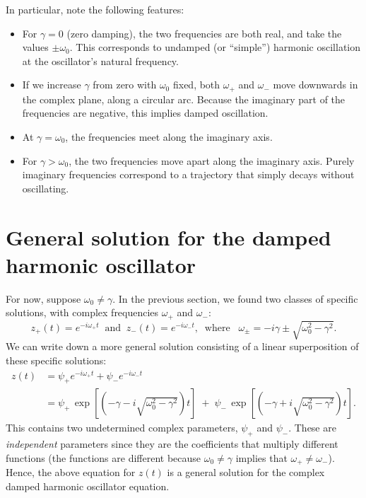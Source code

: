 \documentclass[10pt,a4paper]{article}
\begin{document}
\pagebreak
\noindent
In particular, note the following features:
\begin{itemize}
\item
  For $\gamma = 0$ (zero damping), the two frequencies are both real,
  and take the values $\pm \omega_0$. This corresponds to undamped (or
  ``simple'') harmonic oscillation at the oscillator's natural
  frequency.
\item
  If we increase $\gamma$ from zero with $\omega_0$ fixed, both
  $\omega_+$ and $\omega_-$ move downwards in the complex plane,
  along a circular arc. Because the imaginary part of the frequencies
  are negative, this implies damped oscillation.

\item
  At $\gamma = \omega_0$, the frequencies meet along the imaginary
  axis.

\item
  For $\gamma > \omega_0$, the two frequencies move apart along the
  imaginary axis. Purely imaginary frequencies correspond to a
  trajectory that simply decays without oscillating.
\end{itemize}

\section{General solution for the damped harmonic oscillator}
\label{general-solution}

For now, suppose $\omega_0 \ne \gamma$. In the previous section, we
found two classes of specific solutions, with complex frequencies
$\omega_+$ and $\omega_-$:
\begin{equation}
  z_+(t) = e^{-i\omega_+ t} \;\;\mathrm{and}\;\;
  z_-(t) = e^{-i\omega_- t}, \;\;\mathrm{where}\;\;\;
  \omega_\pm = -i\gamma \pm \sqrt{\omega_0^2 - \gamma^2}.
\end{equation}
We can write down a more general solution consisting of a linear
superposition of these specific solutions:
\begin{align}
  z(t) &= \psi_+ e^{-i\omega_+ t} + \psi_- e^{-i\omega_- t} \\
  &= \psi_+ \, \exp\left[\left(-\gamma  - i \sqrt{\omega_0^2 - \gamma^2}\right)t\right] \; +\; \psi_- \, \exp\left[\left(-\gamma +i\sqrt{\omega_0^2 - \gamma^2}\right)t\right].
\end{align}
This contains two undetermined complex parameters, $\psi_+$ and
$\psi_-$. These are \emph{independent} parameters since they are the
coefficients that multiply different functions (the functions are
different because $\omega_0 \ne \gamma$ implies that $\omega_+ \ne
\omega_-$). Hence, the above equation for $z(t)$ is a general solution
for the complex damped harmonic oscillator equation.
\end{document}
